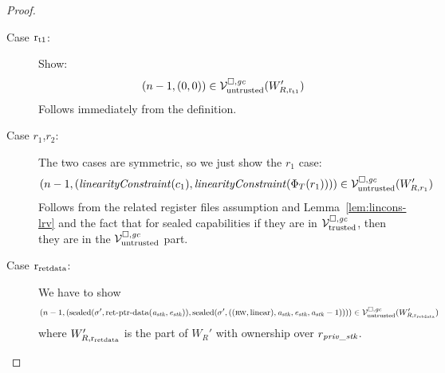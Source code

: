 \begin{proof}
\begin{description}
  \item[Case $\rtmp{1}$:] Show:
    \[
      \npair[n-1]{(0,0)} \in \lrv(W_{R,\rtmp{1}}')
    \]
    Follows immediately from the definition.

  \item[Case $r_1$,$r_2$:] The two cases are symmetric, so we just show the $r_1$ case:
    \[
      \npair[n-1]{(\linCons{c_1},\linCons{\Phi_T(r_1)})} \in \lrv(W_{R,r_1}')
    \]
    Follows from the related register files assumption and Lemma~\ref{lem:lincons-lrv} and the fact that for sealed capabilities if they are in $\lrvg{\trusted}$, then they are in the $\lrv$ part.

  \item[Case $\rretd$:] We have to show
    \[
      \npair[n-1]{(\sealed{\sigma',\retptrd(\aaddr_\stk,\eaddr_\stk)},\sealed{\sigma',((\rw,\linear),\aaddr_\stk,\eaddr_\stk,\aaddr_\stk-1)})} \in \lrv(W_{R,\rretd}')
    \]
    where $W_{R,\rretd}'$ is the part of $W_R'$ with ownership over $r_\var{priv\_stk}$.


\end{description}
\end{proof}
